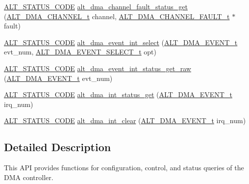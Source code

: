 \begin{DoxyCompactItemize}
\item 
\mbox{\hyperlink{hwlib_8h_abdb0d369f069723ca55d6c94bcaaaa12}{A\+L\+T\+\_\+\+S\+T\+A\+T\+U\+S\+\_\+\+C\+O\+DE}} \mbox{\hyperlink{group__ALT__DMA__CSR_ga817174770f199b336f16b2c6544040d4}{alt\+\_\+dma\+\_\+channel\+\_\+fault\+\_\+status\+\_\+get}} (\mbox{\hyperlink{group__ALT__DMA__COMMON_ga959232e3b00ce45a3049183cce4c9d59}{A\+L\+T\+\_\+\+D\+M\+A\+\_\+\+C\+H\+A\+N\+N\+E\+L\+\_\+t}} channel, \mbox{\hyperlink{group__ALT__DMA__CSR_ga6bbb27dff1001aeef88e779c4e57874c}{A\+L\+T\+\_\+\+D\+M\+A\+\_\+\+C\+H\+A\+N\+N\+E\+L\+\_\+\+F\+A\+U\+L\+T\+\_\+t}} $\ast$fault)
\item 
\mbox{\hyperlink{hwlib_8h_abdb0d369f069723ca55d6c94bcaaaa12}{A\+L\+T\+\_\+\+S\+T\+A\+T\+U\+S\+\_\+\+C\+O\+DE}} \mbox{\hyperlink{group__ALT__DMA__CSR_ga641f2673530bed7fffda687b8aabadb0}{alt\+\_\+dma\+\_\+event\+\_\+int\+\_\+select}} (\mbox{\hyperlink{group__ALT__DMA__COMMON_gad02f1735ad41b201414e8d032e0f9426}{A\+L\+T\+\_\+\+D\+M\+A\+\_\+\+E\+V\+E\+N\+T\+\_\+t}} evt\+\_\+num, \mbox{\hyperlink{group__ALT__DMA__CSR_gae4b36b414418458c2b8a3c2931a37a49}{A\+L\+T\+\_\+\+D\+M\+A\+\_\+\+E\+V\+E\+N\+T\+\_\+\+S\+E\+L\+E\+C\+T\+\_\+t}} opt)
\item 
\mbox{\hyperlink{hwlib_8h_abdb0d369f069723ca55d6c94bcaaaa12}{A\+L\+T\+\_\+\+S\+T\+A\+T\+U\+S\+\_\+\+C\+O\+DE}} \mbox{\hyperlink{group__ALT__DMA__CSR_ga69d4ccc1669d51064b344d9bd114e4f5}{alt\+\_\+dma\+\_\+event\+\_\+int\+\_\+status\+\_\+get\+\_\+raw}} (\mbox{\hyperlink{group__ALT__DMA__COMMON_gad02f1735ad41b201414e8d032e0f9426}{A\+L\+T\+\_\+\+D\+M\+A\+\_\+\+E\+V\+E\+N\+T\+\_\+t}} evt\+\_\+num)
\item 
\mbox{\hyperlink{hwlib_8h_abdb0d369f069723ca55d6c94bcaaaa12}{A\+L\+T\+\_\+\+S\+T\+A\+T\+U\+S\+\_\+\+C\+O\+DE}} \mbox{\hyperlink{group__ALT__DMA__CSR_ga07633dd0fcb1dc369e33d2f2eea0bd8f}{alt\+\_\+dma\+\_\+int\+\_\+status\+\_\+get}} (\mbox{\hyperlink{group__ALT__DMA__COMMON_gad02f1735ad41b201414e8d032e0f9426}{A\+L\+T\+\_\+\+D\+M\+A\+\_\+\+E\+V\+E\+N\+T\+\_\+t}} irq\+\_\+num)
\item 
\mbox{\hyperlink{hwlib_8h_abdb0d369f069723ca55d6c94bcaaaa12}{A\+L\+T\+\_\+\+S\+T\+A\+T\+U\+S\+\_\+\+C\+O\+DE}} \mbox{\hyperlink{group__ALT__DMA__CSR_gaf26e4ade293e06f6a18afb914d3e2e02}{alt\+\_\+dma\+\_\+int\+\_\+clear}} (\mbox{\hyperlink{group__ALT__DMA__COMMON_gad02f1735ad41b201414e8d032e0f9426}{A\+L\+T\+\_\+\+D\+M\+A\+\_\+\+E\+V\+E\+N\+T\+\_\+t}} irq\+\_\+num)
\end{DoxyCompactItemize}


\subsection{Detailed Description}
This A\+PI provides functions for configuration, control, and status queries of the D\+MA controller. 

